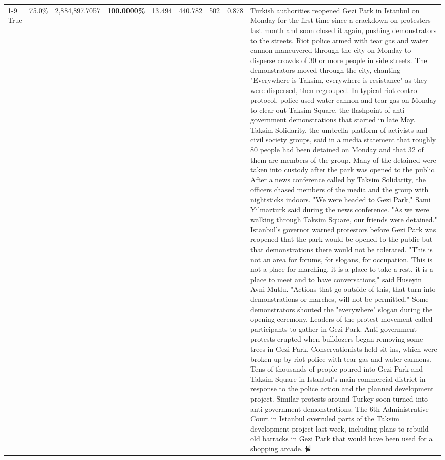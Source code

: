 \begin{table}[H]
\begin{tabular}{lllrlllll}
\cline{1-9}
True & 75.0\% & 2,884,897.7057 & \bfseries \color{red} 100.0000\% & 13.494 & 440.782 & 502 & 0.878 & Turkish authorities reopened Gezi Park in Istanbul on Monday for the first time since a crackdown on protesters last month and soon closed it again, pushing demonstrators to the streets. Riot police armed with tear gas and water cannon maneuvered through the city on Monday to disperse crowds of 30 or more people in side streets. The demonstrators moved through the city, chanting "Everywhere is Taksim, everywhere is resistance" as they were dispersed, then regrouped. In typical riot control protocol, police used water cannon and tear gas on Monday to clear out Taksim Square, the flashpoint of anti-government demonstrations that started in late May. Taksim Solidarity, the umbrella platform of activists and civil society groups, said in a media statement that roughly 80 people had been detained on Monday and that 32 of them are members of the group. Many of the detained were taken into custody after the park was opened to the public. After a news conference called by Taksim Solidarity, the officers chased members of the media and the group with nightsticks indoors. "We were headed to Gezi Park," Sami Yilmazturk said during the news conference. "As we were walking through Taksim Square, our friends were detained." Istanbul's governor warned protestors before Gezi Park was reopened that the park would be opened to the public but that demonstrations there would not be tolerated. "This is not an area for forums, for slogans, for occupation. This is not a place for marching, it is a place to take a rest, it is a place to meet and to have conversations," said Huseyin Avni Mutlu. "Actions that go outside of this, that turn into demonstrations or marches, will not be permitted." Some demonstrators shouted the "everywhere" slogan during the opening ceremony. Leaders of the protest movement called participants to gather in Gezi Park. Anti-government protests erupted when bulldozers began removing some trees in Gezi Park. Conservationists held sit-ins, which were broken up by riot police with tear gas and water cannons. Tens of thousands of people poured into Gezi Park and Taksim Square in Istanbul's main commercial district in response to the police action and the planned development project. Similar protests around Turkey soon turned into anti-government demonstrations. The 6th Administrative Court in Istanbul overruled parts of the Taksim development project last week, including plans to rebuild old barracks in Gezi Park that would have been used for a shopping arcade. 팔 \\

\end{tabular}
\end{table}
